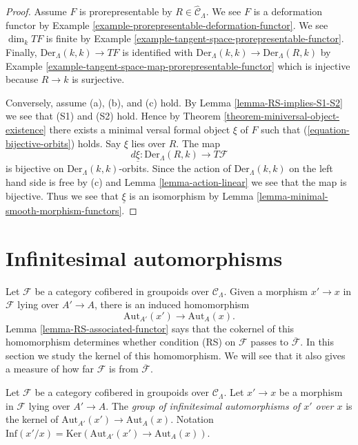 \begin{proof}
Assume $F$ is prorepresentable by $R \in \widehat{\mathcal{C}}_\Lambda$.
We see $F$ is a deformation functor by
Example \ref{example-prorepresentable-deformation-functor}.
We see $\dim_k TF$ is finite by
Example \ref{example-tangent-space-prorepresentable-functor}.
Finally, $\text{Der}_\Lambda(k, k) \to TF$ is identified with
$\text{Der}_\Lambda(k, k) \to \text{Der}_\Lambda(R, k)$ by
Example \ref{example-tangent-space-map-prorepresentable-functor}
which is injective because $R \to k$ is surjective.

\medskip\noindent
Conversely, assume (a), (b), and (c) hold. By
Lemma \ref{lemma-RS-implies-S1-S2}
we see that (S1) and (S2) hold. Hence by
Theorem \ref{theorem-miniversal-object-existence}
there exists a minimal versal formal object $\xi$ of $F$ such that
(\ref{equation-bijective-orbits}) holds. Say $\xi$ lies over $R$.
The map
$$
d\underline{\xi} : \text{Der}_\Lambda(R, k) \to T\mathcal{F}
$$
is bijective on $\text{Der}_\Lambda(k, k)$-orbits. Since the action
of $\text{Der}_\Lambda(k, k)$ on the left hand side is free by (c) and
Lemma \ref{lemma-action-linear}
we see that the map is bijective. Thus we see that $\underline{\xi}$
is an isomorphism by
Lemma \ref{lemma-minimal-smooth-morphism-functors}.
\end{proof}




\section{Infinitesimal automorphisms}
\label{section-infinitesimal-automorphisms}

\noindent
Let $\mathcal{F}$ be a category cofibered in groupoids over
$\mathcal{C}_\Lambda$. Given a morphism $x' \to x$ in $\mathcal{F}$ lying over
$A' \to A$, there is an induced homomorphism
$$
\text{Aut}_{A'}(x') \to \text{Aut}_A(x).
$$
Lemma \ref{lemma-RS-associated-functor}
says that the cokernel of this homomorphism determines whether
condition (RS) on $\mathcal{F}$ passes to $\overline{\mathcal{F}}$.
In this section we study the kernel of this homomorphism. We will see
that it also gives a measure of how far $\mathcal{F}$
is from $\overline{\mathcal{F}}$.

\begin{definition}
\label{definition-relative-infinitesimal-auts}
Let $\mathcal{F}$ be a category cofibered in groupoids over $\mathcal
C_\Lambda$. Let $x' \to x$ be a morphism in $\mathcal{F}$ lying over
$A' \to A$. The {\it group of infinitesimal automorphisms
of $x'$ over $x$} is the kernel of
$\text{Aut}_{A'}(x') \to \text{Aut}_A(x)$.
Notation
$\text{Inf}(x'/x) = \text{Ker}(\text{Aut}_{A'}(x') \to \text{Aut}_A(x))$.
\end{definition}

